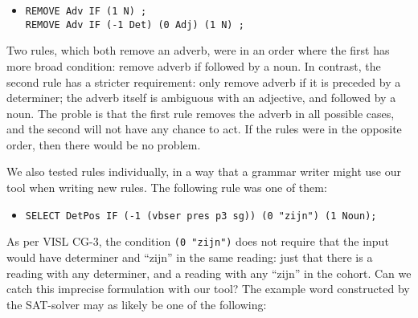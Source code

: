 \begin{itemize}
\item[] 
\begin{verbatim}REMOVE Adv IF (1 N) ;
REMOVE Adv IF (-1 Det) (0 Adj) (1 N) ;
\end{verbatim}
\end{itemize}

Two rules, which both remove an adverb, were in an order where the first has more broad condition: remove adverb if followed by a noun. In contrast, the second rule has a stricter requirement: only remove adverb if it is preceded by a determiner; the adverb itself is ambiguous with an adjective, and followed by a noun. The proble is that the first rule removes the adverb in all possible cases, and the second will not have any chance to act. If the rules were in the opposite order, then there would be no problem.





We also tested rules individually, in a way that a grammar writer might use our tool when writing new rules.
The following rule was one of them:

\begin{itemize}
\item[] 
\texttt{SELECT DetPos IF (-1 (vbser pres p3 sg)) (0 "zijn") (1 Noun);}
\end{itemize} 

As per VISL CG-3, the condition \texttt{(0 "zijn")} does not require
that the input would have determiner and ``zijn'' in the same reading:
just that there is a reading with any determiner, and a reading with any ``zijn'' in the cohort. 
Can we catch this imprecise formulation with our tool? The example word constructed by the SAT-solver may as likely be one of the following:

